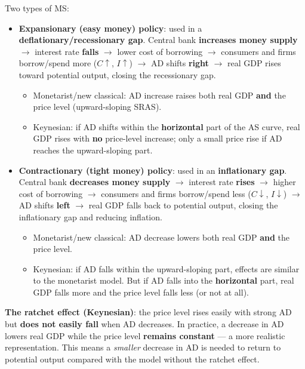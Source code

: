 \documentclass[a4paper,12pt]{article}
\begin{document}
Two types of MS:
\begin{itemize}
  \item \textbf{Expansionary (easy money) policy}: used in a \textbf{deflationary/recessionary gap}. Central bank \textbf{increases money supply} $\to$ interest rate \textbf{falls} $\to$ lower cost of borrowing $\to$ consumers and firms borrow/spend more ($C \uparrow$, $I \uparrow$) $\to$ AD shifts \textbf{right} $\to$ real GDP rises toward potential output, closing the recessionary gap.
  \begin{itemize}
    \item Monetarist/new classical: AD increase raises both real GDP \textbf{and} the price level (upward-sloping SRAS).
    \item Keynesian: if AD shifts within the \textbf{horizontal} part of the AS curve, real GDP rises with \textbf{no} price-level increase; only a small price rise if AD reaches the upward-sloping part.
  \end{itemize}
  \item \textbf{Contractionary (tight money) policy}: used in an \textbf{inflationary gap}. Central bank \textbf{decreases money supply} $\to$ interest rate \textbf{rises} $\to$ higher cost of borrowing $\to$ consumers and firms borrow/spend less ($C \downarrow$, $I \downarrow$) $\to$ AD shifts \textbf{left} $\to$ real GDP falls back to potential output, closing the inflationary gap and reducing inflation.
  \begin{itemize}
    \item Monetarist/new classical: AD decrease lowers both real GDP \textbf{and} the price level.
    \item Keynesian: if AD falls within the upward-sloping part, effects are similar to the monetarist model. But if AD falls into the \textbf{horizontal} part, real GDP falls more and the price level falls less (or not at all).
  \end{itemize}
\end{itemize}
\textbf{The ratchet effect (Keynesian)}: the price level rises easily with strong AD but \textbf{does not easily fall} when AD decreases. In practice, a decrease in AD lowers real GDP while the price level \textbf{remains constant} --- a more realistic representation. This means a \textit{smaller} decrease in AD is needed to return to potential output compared with the model without the ratchet effect.
\end{document}
